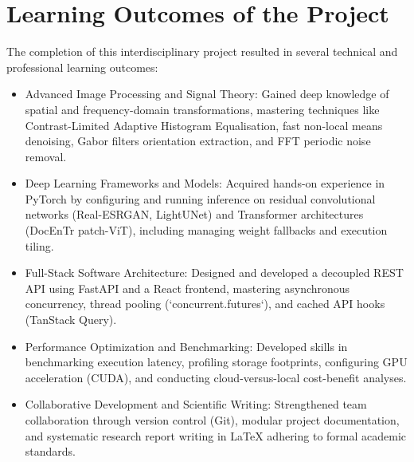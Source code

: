 \section{Learning Outcomes of the Project}

The completion of this interdisciplinary project resulted in several technical and professional learning outcomes:
\begin{itemize}
	\item Advanced Image Processing and Signal Theory: Gained deep knowledge of spatial and frequency-domain transformations, mastering techniques like Contrast-Limited Adaptive Histogram Equalisation, fast non-local means denoising, Gabor filters orientation extraction, and FFT periodic noise removal.
	
	\item Deep Learning Frameworks and Models: Acquired hands-on experience in PyTorch by configuring and running inference on residual convolutional networks (Real-ESRGAN, LightUNet) and Transformer architectures (DocEnTr patch-ViT), including managing weight fallbacks and execution tiling.
	
	\item Full-Stack Software Architecture: Designed and developed a decoupled REST API using FastAPI and a React frontend, mastering asynchronous concurrency, thread pooling (`concurrent.futures`), and cached API hooks (TanStack Query).
	
	\item Performance Optimization and Benchmarking: Developed skills in benchmarking execution latency, profiling storage footprints, configuring GPU acceleration (CUDA), and conducting cloud-versus-local cost-benefit analyses.
	
	\item Collaborative Development and Scientific Writing: Strengthened team collaboration through version control (Git), modular project documentation, and systematic research report writing in LaTeX adhering to formal academic standards.
\end{itemize}
